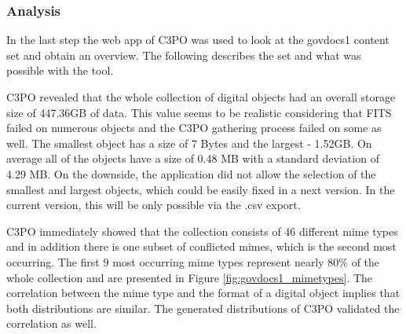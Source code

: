 \subsubsection{Analysis}
In the last step the web app of C3PO was used to look at the govdocs1 content set and obtain an overview.
The following describes the set and what was possible with the tool.

C3PO revealed that the whole collection of digital objects had an overall storage size of 447.36GB of data.
This value seems to be realistic considering that FITS failed on numerous objects and the C3PO gathering process failed on some as well.
The smallest object has a size of 7 Bytes and the largest - 1.52GB.
On average all of the objects have a size of 0.48 MB with a standard deviation of 4.29 MB.
On the downside, the application did not allow the selection of the smallest and largest objects, which could be easily fixed in a next version.
In the current version, this will be only possible via the .csv export.

C3PO immediately showed that the collection consists of 46 different mime types and in addition there is one subset of conflicted mimes, which is the second most occurring.
The first 9 most occurring mime types represent nearly 80\% of the whole collection and are presented in Figure \ref{fig:govdocs1_mimetypes}.
The correlation between the mime type and the format of a digital object implies that both distributions are similar.
The generated distributions of C3PO validated the correlation as well.



